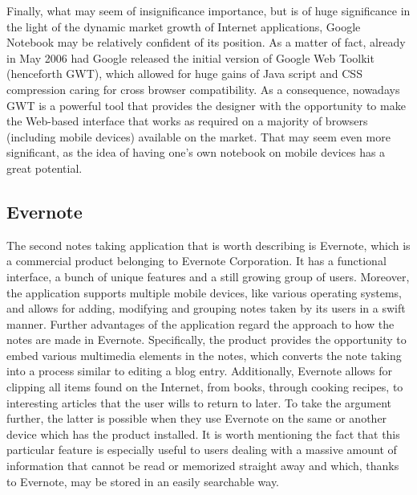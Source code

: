 Finally, what may seem of insignificance importance, but is of huge significance in the light of the dynamic market growth of Internet applications, Google Notebook may be relatively confident of its position. As a matter of fact, already in May 2006 had Google released the initial version of Google Web Toolkit (henceforth GWT), which allowed for huge gains of Java script and CSS compression caring for cross browser compatibility. As a consequence, nowadays GWT is a powerful tool that provides the designer with the opportunity to make the Web-based interface that works as required on a majority of browsers (including mobile devices) available on the market. That may seem even more significant, as the idea of having one's own notebook on mobile devices has a great potential. 

\subsection{Evernote}\label{subsec:evernote}
The second notes taking application that is worth describing is Evernote, which is a commercial product belonging to Evernote Corporation. It has a functional interface, a bunch of unique features and a still growing group of users. Moreover, the application supports multiple mobile devices, like various operating systems, and allows for adding, modifying and grouping notes taken by its users in a swift manner. Further advantages of the application regard the approach to how the notes are made in Evernote. Specifically, the product provides the opportunity to embed various multimedia elements in the notes, which converts the note taking into a process similar to editing a blog entry. Additionally, Evernote allows for clipping all items found on the Internet, from books, through cooking recipes, to interesting articles that the user wills to return to later. To take the argument further, the latter is possible when they use Evernote on the same or another device which has the product installed. It is worth mentioning the fact that this particular feature is especially useful to users dealing with a massive amount of information that cannot be read or memorized straight away and which, thanks to Evernote, may be stored in an easily searchable way. 
